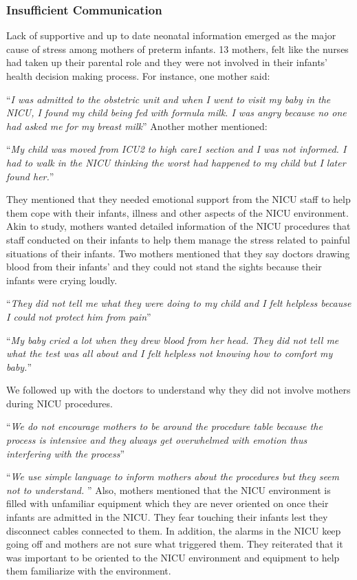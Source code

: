 \subsubsection{Insufficient Communication} 
Lack of supportive and up to date neonatal information emerged as the major cause of stress among mothers of preterm infants. 13 mothers, felt like the nurses had taken up their parental role and they were not involved in their infants' health decision making process. For instance, one mother said:

\enquote{\itshape I was admitted to the obstetric unit and when I went to visit my baby in the NICU, I found my child being fed with formula milk. I was angry because no one had asked me for my breast milk} \bigbreak
Another mother mentioned:

\enquote{\itshape My child was moved from ICU2 to high care1 section and I was not informed. I had to walk in the NICU thinking the worst had happened to my child but I later found her.} \bigbreak

They mentioned that they needed emotional support from the NICU staff to help them cope with their infants, illness and other aspects of the NICU environment. Akin to \citep{Axelin2006} study, mothers wanted detailed information of the NICU procedures that staff conducted on their infants to help them manage the stress related to painful situations of their infants. Two mothers mentioned that they say doctors drawing blood from their infants' and they could not stand the sights because their infants were crying loudly.

\enquote{\itshape They did not tell me what they were doing to my child and I felt helpless because I could not protect him from pain}\bigbreak

\enquote{\itshape My baby cried a lot when they drew blood from her head. They did not tell me what the test was all about and I felt helpless not knowing how to comfort my baby.}\bigbreak

We followed up with the doctors to understand why they did not involve mothers during NICU procedures.


\enquote{\itshape We do not encourage mothers to be around the procedure table because the process is intensive and they always get overwhelmed with emotion thus interfering with the process}\bigbreak


\enquote{\itshape We use simple language to inform mothers about the procedures but they seem not to understand. }\bigbreak
Also, mothers mentioned that the NICU environment is filled with unfamiliar equipment which they are never oriented on once their infants are admitted in the NICU. They fear touching their infants lest they disconnect cables connected to them. In addition, the alarms in the NICU keep going off and mothers are not sure what triggered them. They reiterated that it was important to be oriented to the NICU environment and equipment to help them familiarize with the environment. 


